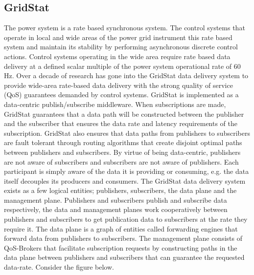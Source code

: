 \documentclass{article}
\begin{document}
\subsection{GridStat}
The power system is a rate based synchronous system. The control systems that operate 
in local and wide areas of the power grid instrument this rate based system and 
maintain its stability by performing asynchronous discrete control actions.  Control 
systems operating in the wide area require rate based data delivery at a defined scalar 
multiple of the power system operational rate of 60 Hz.  Over a decade of research has
 gone into the GridStat data delivery system to provide wide-area rate-based data 
delivery with the strong quality of service (QoS) guarantees demanded by control 
systems.  GridStat is implemented as a data-centric publish/subscribe middleware.  
When subscriptions are made, GridStat guarantees that a data path will be constructed
 between the publisher and the subscriber that ensures the data rate and latency 
requirements of the subscription.  GridStat also ensures that data paths from publishers 
to subscribers are fault tolerant through routing algorithms that create disjoint 
optimal paths between publishers and subscribers.  By virtue of being data-centric, 
publishers are not aware of subscribers and subscribers are not aware of publishers. 
 Each participant is simply aware of the data it is providing or consuming, e.g. the 
data itself decouples its producers and consumers.  The GridStat data delivery system 
exists as a few logical entities; publishers, subscribers, the data plane and the 
management plane. Publishers and subscribers publish and subscribe data respectively, 
the data and management planes work cooperatively between publishers and subscribers 
to get publication data to subscribers at the rate they require it.  The data plane is 
a graph of entities called forwarding engines that forward data from publishers to 
subscribers.  The management plane consists of QoS-Brokers that facilitate subscription 
requests by constructing paths in the data plane between publishers and subscribers 
that can guarantee the requested data-rate.  Consider the figure below. \\
\end{document}
